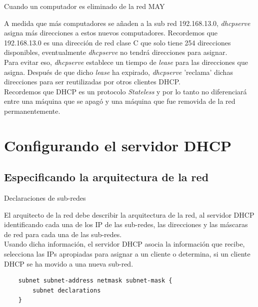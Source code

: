 \begin{frame}[fragile]{Cuando un computador es eliminado de la red MAY}

   A medida que más computadores se añaden a la sub red 192.168.13.0,
   \textit{dhcpserve} asigna más direcciones a estos nuevos computadores.
   Recordemos que 192.168.13.0 es una dirección de red clase C que solo tiene
   254 direcciones disponibles, eventualmente \textit{dhcpserve} no tendrá
   direcciones para asignar.\\[0.2cm]

   Para evitar eso, \textit{dhcpserve} establece un tiempo de \textit{lease}
   para las direcciones que asigna. Después de que dicho \textit{lease} ha
   expirado, \textit{dhcpserve} 'reclama' dichas direcciones para ser
   reutilizadas por otros clientes DHCP.\\[0.2cm]

   Recordemos que DHCP es un protocolo \textit{Stateless} y por lo tanto no
   diferenciará entre una máquina que se apagó y una máquina que fue removida
   de la red permanentemente.\\[0.2cm]

\end{frame}

\section{Configurando el servidor DHCP} %
\label{sec:Configurando el servidor DHCP}


\subsection{Especificando la arquitectura de la red} %
\label{sub:Especificando la arquitectura de la red}


\begin{frame}{Declaraciones de sub-redes} 
    
    El arquitecto de la red debe describir la arquitectura de la red, al
    servidor DHCP identificando cada una de los IP de las sub-redes, las
    direcciones y las máscaras de red para cada una de las sub-redes.\\[0.2cm]

    Usando dicha información, el servidor DHCP asocia la información que
    recibe, selecciona las IPs apropiadas para asignar a un cliente o
    determina, si un cliente DHCP se ha movido a una nueva
    sub-red.\\[0.2cm]


    \begin{verbatim}
    subnet subnet-address netmask subnet-mask {
        subnet declarations
    }
    \end{verbatim}
    
\end{frame}

